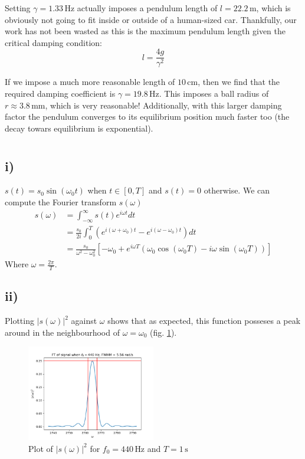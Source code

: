 \documentclass{article}
\begin{document}
Setting $\gamma = 1.33 \,\si{\Hz}$ actually imposes a pendulum length of $l = 22.2 \,\si{\m}$, which is obviously not going to fit inside or outside of a human-sized car. 
Thankfully, our work has not been wasted as 
this is the maximum pendulum length given the critical damping condition:
\begin{equation}
    l = \frac{4g}{\gamma^2}
\end{equation}

If we impose a much more reasonable length of $10 \,\si{\cm}$, then we find that the required damping coefficient is $\gamma = 19.8 \,\si{\Hz}$. This imposes a ball radius of $r \approx 3.8 \,\si{\mm}$, which is very reasonable! Additionally, with this larger damping factor the pendulum converges to its equilibrium position much faster too (the decay towars equilibrium is exponential).



\section{}
\subsection*{i)}
$s(t) = s_0 \sin(\omega_0 t)$ when $t\in[0, T]$ and $s(t)=0$ otherwise. We can compute the Fourier transform $s(\omega)$
\begin{equation}
\begin{split}
    s(\omega) &= \int ^{\infty}_{-\infty} s(t)e^{i\omega t}dt \\
    &= \frac{s_0}{2i} \int ^T _0 \left( e^{i(\omega+\omega_0)t} - e^{i(\omega-\omega_0)t} \right)dt \\
    &= \frac{s_0}{\omega^2 - \omega_0^2} \left[ -\omega_0 + e^{i\omega T}\left( \omega_0\cos(\omega_0 T) - i\omega\sin(\omega_0 T) \right) \right]
\end{split}
\end{equation}
Where $\omega = \frac{2\pi}{T}$.

\subsection*{ii)}

Plotting $|s(\omega)|^2$ against $\omega$ shows that as expected, this function posseses a peak around in the neighbourhood of $\omega = \omega_0$ (fig. \ref{fig:peak_440hz}).

\begin{figure}
    \centering
    \includegraphics[width=0.5\textwidth]{figs/fouriert_f_0=440.png}
    \caption{Plot of $|s(\omega)|^2$ for $f_0 = 440  \,\si{\Hz}$ and $T = 1  \,\si{\s}$}
    \label{fig:peak_440hz}
\end{figure}
\end{document}
